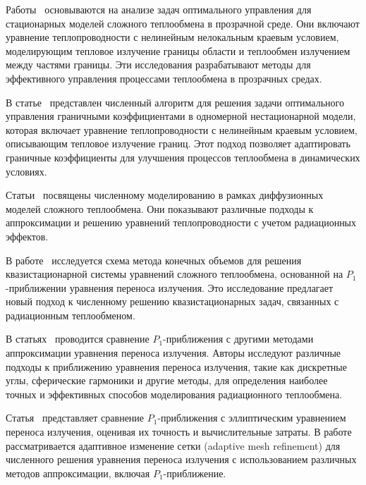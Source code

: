 Работы~\cite{birgelis2003optimal, meyer2006optimal, meyer2009state, Philip2010}
основываются на анализе задач оптимального управления для стационарных моделей
сложного теплообмена в прозрачной среде.
Они включают уравнение теплопроводности с нелинейным нелокальным краевым условием,
моделирующим тепловое излучение границы области и теплообмен излучением между частями границы.
Эти исследования разрабатывают методы для эффективного управления процессами теплообмена
в прозрачных средах.

В статье~\cite{belmiloudi2014nonlinear} представлен численный алгоритм для решения
задачи оптимального управления граничными коэффициентами в одномерной нестационарной модели,
которая включает уравнение теплопроводности с нелинейным краевым условием,
описывающим тепловое излучение границ.
Этот подход позволяет адаптировать граничные коэффициенты для улучшения процессов
теплообмена в динамических условиях.

Статьи~\cite{kovtanyuk2013iterative, Thommes2002, Pinnau2008, Siewert1991}
посвящены численному моделированию в рамках диффузионных моделей сложного теплообмена.
Они показывают различные подходы к аппроксимации и решению уравнений теплопроводности
с учетом радиационных эффектов.

В работе~\cite{gallouet2016analysis} исследуется схема метода конечных объемов
для решения квазистационарной системы уравнений сложного теплообмена,
основанной на $P_1$-приближении уравнения переноса излучения.
Это исследование предлагает новый подход к численному решению квазистационарных задач,
связанных с радиационным теплообменом.



В статьях~\cite{
    modest2014elliptic, frank2011adaptive, kovtanyuk2012, Thommes2002, Larsen2002, Frank2007,
} проводится сравнение $P_1$-приближения с другими методами аппроксимации уравнения переноса излучения.
Авторы исследуют различные подходы к приближению уравнения переноса излучения,
такие как дискретные углы, сферические гармоники и другие методы,
для определения наиболее точных и эффективных способов моделирования радиационного теплообмена.

Статья~\cite{modest2014elliptic} представляет сравнение $P_1$-приближения
с эллиптическим уравнением переноса излучения, оценивая их точность и вычислительные затраты.
В работе~\cite{frank2011adaptive} рассматривается
адаптивное изменение сетки (adaptive mesh refinement)
для численного решения уравнения переноса излучения
с использованием различных методов аппроксимации, включая $P_1$-приближение.

